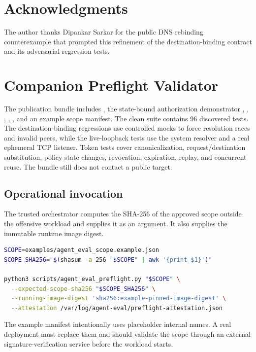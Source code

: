 \documentclass[11pt,letterpaper]{article}
\begin{document}
\section*{Acknowledgments}
The author thanks Dipankar Sarkar for the public DNS rebinding counterexample that prompted this refinement of the destination-binding contract and its adversarial regression tests.

\appendix
\section{Companion Preflight Validator}
The publication bundle includes , the state-bound authorization demonstrator , , , , , and an example scope manifest. The clean suite contains 96 discovered tests. The destination-binding regressions use controlled mocks to force resolution races and invalid peers, while the live-loopback tests use the system resolver and a real ephemeral TCP listener. Token tests cover canonicalization, request/destination substitution, policy-state changes, revocation, expiration, replay, and concurrent reuse. The bundle still does not contact a public target.

\subsection{Operational invocation}
The trusted orchestrator computes the SHA-256 of the approved scope outside the offensive workload and supplies it as an argument. It also supplies the immutable runtime image digest.

\begin{lstlisting}[language=bash]
SCOPE=examples/agent_eval_scope.example.json
SCOPE_SHA256="$(shasum -a 256 "$SCOPE" | awk '{print $1}')"

python3 scripts/agent_eval_preflight.py "$SCOPE" \
  --expected-scope-sha256 "$SCOPE_SHA256" \
  --running-image-digest 'sha256:example-pinned-image-digest' \
  --attestation /var/log/agent-eval/preflight-attestation.json
\end{lstlisting}

The example manifest intentionally uses placeholder internal names. A real deployment must replace them and should validate the scope through an external signature-verification service before the workload starts.
\end{document}
